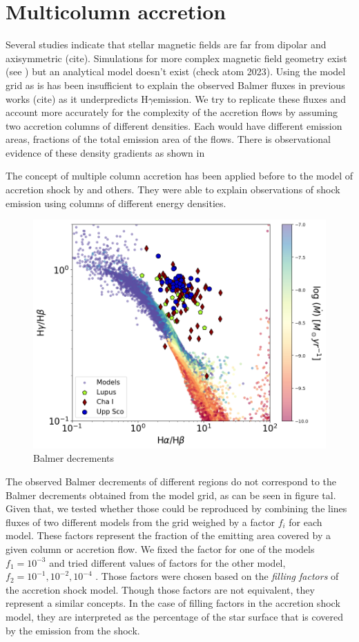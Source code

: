 \documentclass[twocolumn,linenumbers]{aastex631}
\newcommand{\hgamma}{H$\gamma$}
\begin{document}
\section{Multicolumn accretion}

Several studies indicate that stellar magnetic fields are far from dipolar and axisymmetric (cite). Simulations for more complex magnetic field geometry exist (see \citet{romanova2003}) but an analytical model doesn't exist (check atom 2023). Using the model grid as is has been insufficient to explain the observed Balmer fluxes in previous works (cite) as it underpredicts \hgamma emission. We try to replicate these fluxes and account more accurately for the complexity of the accretion flows by assuming two accretion columns of different densities. Each would have different emission areas, fractions of the total emission area of the flows. There is observational evidence of these density gradients as shown in \citet{}

 The concept of multiple column accretion has been applied before to the model of accretion shock by \citet{pittman2022} and others. They were able to explain observations of shock emission using columns of different energy densities. 

\begin{figure}
    \centering
    \includegraphics[width=0.8\linewidth]{figures/BalmerDecrements.png}
    \caption{Balmer decrements}
    \label{fig:balmer_decrement}
\end{figure}

The observed Balmer decrements of different regions do not correspond to the Balmer decrements obtained from the model grid, as can be seen in figure tal. Given that, we tested whether those could be reproduced by combining the lines fluxes of two different models from the grid weighed by a factor $f_i$ for each model. These factors represent the fraction of the emitting area covered by a given column or accretion flow. We fixed the factor for one of the models $f_1=10^{-3}$ and tried different values of factors for the other model, $f_2 = 10^{-1},10^{-2},10^{-4}$ .  Those factors were chosen based on the \textit{filling factors} of the accretion shock model. Though those factors are not equivalent, they represent a similar concepts. In the case of filling factors in the accretion shock model, they are interpreted as the percentage of the star surface that is covered by the emission from the shock.
\end{document}
